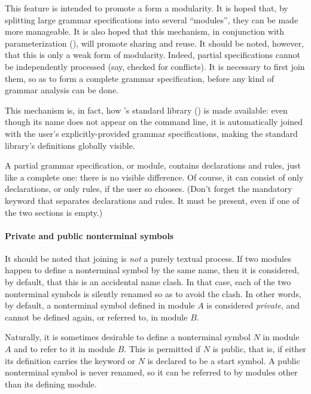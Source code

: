 \documentclass[onecolumn,11pt,nocopyrightspace,preprint]{sigplanconf}
\begin{document}
This feature is intended to promote a form a modularity. It is hoped that, by
splitting large grammar specifications into several ``modules'', they can be
made more manageable. It is also hoped that this mechanism, in conjunction
with parameterization (), will promote sharing and reuse.
It should be noted, however, that this is only a weak form of
modularity. Indeed, partial specifications cannot be independently processed
(say, checked for conflicts).  It is necessary to first join them, so as to
form a complete grammar specification, before any kind of grammar analysis can
be done.

This mechanism is, in fact, how \menhir's standard library ()
is made available: even though its name does not appear on the command line,
it is automatically joined with the user's explicitly-provided grammar
specifications, making the standard library's definitions globally visible.

A partial grammar specification, or module, contains declarations and rules,
just like a complete one: there is no visible difference. Of course, it can
consist of only declarations, or only rules, if the user so chooses. (Don't
forget the mandatory \percentpercent keyword that separates declarations and
rules. It must be present, even if one of the two sections is empty.)

\paragraph{Private and public nonterminal symbols}

It should be noted that joining is \emph{not} a purely textual process. If two
modules happen to define a nonterminal symbol by the same name, then it is
considered, by default, that this is an accidental name clash. In that case,
each of the two nonterminal symbols is silently renamed so as to avoid the
clash. In other words, by default, a nonterminal symbol defined in module $A$
is considered \emph{private}, and cannot be defined again, or referred to, in
module $B$.

Naturally, it is sometimes desirable to define a nonterminal symbol $N$ in
module $A$ and to refer to it in module $B$. This is permitted if $N$ is
public, that is, if either its definition carries the keyword \dpublic or
$N$ is declared to be a start symbol. A public nonterminal symbol is never
renamed, so it can be referred to by modules other than its defining module.
\end{document}
